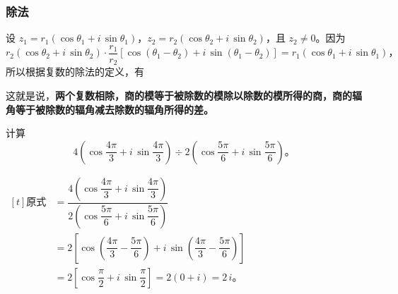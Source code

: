 \subsubsection{除法}\label{subsec:5-7-2}

设 $z_1 = r_1 (\cos\theta_1 + i\,\sin\theta_1)$，$z_2 = r_2 (\cos\theta_2 + i\,\sin\theta_2)$，且 $z_2 \neq 0$。因为
$$ r_2 (\cos\theta_2 + i\,\sin\theta_2) \cdot \dfrac{r_1}{r_2} [\cos(\theta_1 - \theta_2) + i\,\sin(\theta_1 - \theta_2)] = r_1(\cos\theta_1 + i\,\sin\theta_1) \text{，} $$
所以根据复数的除法的定义，有
\begin{center}
\end{center}
这就是说，\textbf{两个复数相除，商的模等于被除数的模除以除数的模所得的商，商的辐角等于被除数的辐角减去除数的辐角所得的差。}


\setcounter{cntliti}{4}
\liti 计算
$$ 4 \left( \cos\dfrac{4\pi}{3} + i\,\sin\dfrac{4\pi}{3} \right) \div 2 \left( \cos\dfrac{5\pi}{6} + i\,\sin\dfrac{5\pi}{6} \right) \text{。}$$

\jie $\begin{aligned}[t]
    \text{原式} &= \dfrac{4 \left( \cos\dfrac{4\pi}{3} + i\,\sin\dfrac{4\pi}{3} \right)}{2 \left( \cos\dfrac{5\pi}{6} + i\,\sin\dfrac{5\pi}{6} \right)} \\
        &= 2 \left[ \cos\left( \dfrac{4\pi}{3} - \dfrac{5\pi}{6} \right) + i\,\sin\left( \dfrac{4\pi}{3} - \dfrac{5\pi}{6} \right) \right] \\
        &= 2 \left[ \cos\dfrac{\pi}{2} + i\,\sin\dfrac{\pi}{2} \right] = 2(0 + i) = 2\,i \text{。}
\end{aligned}$



\lianxi
\begin{xiaotis}


\begin{xiaoxiaotis}





\end{xiaoxiaotis}



\end{xiaotis}

